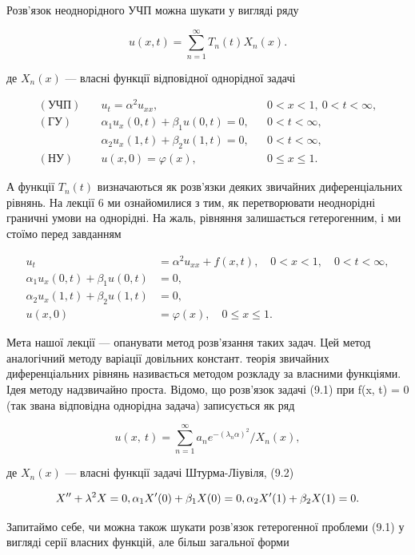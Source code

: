 Розв'язок неоднорідного УЧП можна шукати у вигляді ряду

\[
u(x,t) = \sum_{n=1}^{\infty} T_n(t) X_n(x).
\]

де \(X_n(x)\) --- власні функції відповідної однорідної задачі

\[
\begin{aligned}
(\text{УЧП})\quad & u_t = \alpha^2 u_{xx}, && 0 < x < 1,\ 0 < t < \infty, \\
(\text{ГУ})\quad & \alpha_1 u_x(0,t) + \beta_1 u(0,t) = 0, && 0 < t < \infty, \\
& \alpha_2 u_x(1,t) + \beta_2 u(1,t) = 0, && 0 < t < \infty, \\
(\text{НУ})\quad & u(x,0) = \varphi(x), && 0 \leqslant x \leqslant 1.
\end{aligned}
\]

А функції \(T_n(t)\) визначаються як розв'язки деяких звичайних диференціальних рівнянь. На лекції 6 ми ознайомилися з тим, як перетворювати неоднорідні граничні умови на однорідні. На жаль, рівняння залишається гетерогенним, і ми стоїмо перед завданням

\[
\begin{aligned}
u_{t} &= \alpha^{2} u_{xx} + f(x, t), \quad 0 < x < 1, \quad 0 < t < \infty,\\
\alpha_{1} u_{x}(0, t) + \beta_{1} u(0, t) &= 0, \\
\alpha_{2} u_{x}(1, t) + \beta_{2} u(1, t) &= 0, \\
u(x, 0) &= \varphi(x), \quad 0 \le x \le 1.
\end{aligned}
\]

Мета нашої лекції --- опанувати метод розв'язання таких задач. Цей метод аналогічний методу варіації довільних констант. теорія звичайних диференціальних рівнянь називається методом розкладу за власними функціями. Ідея методу надзвичайно проста. Відомо, що розв'язок задачі (9.1) при f(x, t) = 0 (так звана відповідна однорідна задача) записується як ряд

\[
u\left(x,\ t\right)=\sum_{n=1}^{\infty}a_{n}e^{-\left(\lambda_{n}\alpha\right)^{2}}/X_{n}\left(x\right),
\]

де \(X_n(x)\) --- власні функції задачі Штурма-Ліувіля, (9.2)

\[
X'' + \lambda^2 X = 0, \\ \alpha_1 X'(0) + \beta_1 X(0) = 0, \\ \alpha_2 X'(1) + \beta_2 X(1) = 0.
\]

Запитаймо себе, чи можна також шукати розв'язок гетерогенної проблеми (9.1) у вигляді серії власних функцій, але більш загальної форми

